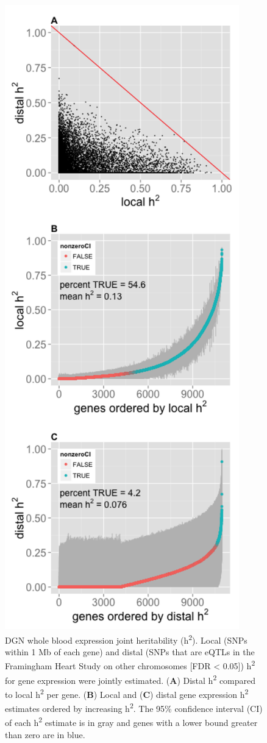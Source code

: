 \documentclass[]{article}
\begin{document}
\begin{figure}[htbp]
\centering
\includegraphics{GenArch_manuscript_files/figure-latex/jointH2-1.pdf}
\caption{DGN whole blood expression joint heritability
(h\textsuperscript{2}). Local (SNPs within 1 Mb of each gene) and distal
(SNPs that are eQTLs in the Framingham Heart Study on other chromosomes
{[}FDR \textless{} 0.05{]}) h\textsuperscript{2} for gene expression
were jointly estimated. (\textbf{A}) Distal h\textsuperscript{2}
compared to local h\textsuperscript{2} per gene. (\textbf{B}) Local and
(\textbf{C}) distal gene expression h\textsuperscript{2} estimates
ordered by increasing h\textsuperscript{2}. The 95\% confidence interval
(CI) of each h\textsuperscript{2} estimate is in gray and genes with a
lower bound greater than zero are in blue.}
\end{figure}
\end{document}

